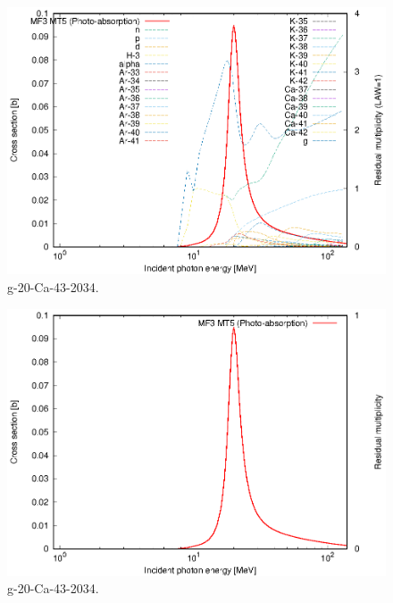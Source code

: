 \begin{figure}
 \includegraphics[width=\linewidth]{eps/g_20-Ca-43_2034.eps}
  \caption{g-20-Ca-43-2034.}
\end{figure}
\begin{figure}
 \includegraphics[width=\linewidth]{eps-law0/g_20-Ca-43_2034.eps}
 \caption{g-20-Ca-43-2034.}
\end{figure}
\newpage \clearpage

